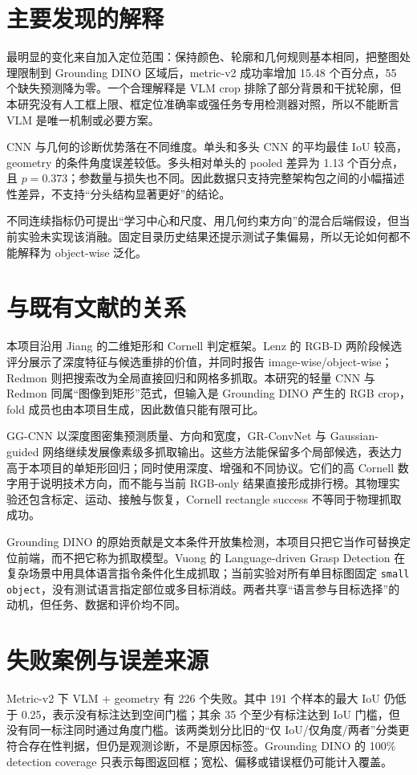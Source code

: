 \documentclass{l4proj}
\begin{document}
\section{主要发现的解释}
最明显的变化来自加入定位范围：保持颜色、轮廓和几何规则基本相同，把整图处理限制到 Grounding DINO 区域后，metric-v2 成功率增加 15.48 个百分点，55 个缺失预测降为零。一个合理解释是 VLM crop 排除了部分背景和干扰轮廓，但本研究没有人工框上限、框定位准确率或强任务专用检测器对照，所以不能断言 VLM 是唯一机制或必要方案。

CNN 与几何的诊断优势落在不同维度。单头和多头 CNN 的平均最佳 IoU 较高，geometry 的条件角度误差较低。多头相对单头的 pooled 差异为 1.13 个百分点，且 $p=0.373$；参数量与损失也不同。因此数据只支持完整架构包之间的小幅描述性差异，不支持“分头结构显著更好”的结论。

不同连续指标仍可提出“学习中心和尺度、用几何约束方向”的混合后端假设，但当前实验未实现该消融。固定目录历史结果还提示测试子集偏易，所以无论如何都不能解释为 object-wise 泛化。

\section{与既有文献的关系}
本项目沿用 Jiang 的二维矩形和 Cornell 判定框架\citep{jiang2011efficient}。Lenz 的 RGB-D 两阶段候选评分展示了深度特征与候选重排的价值，并同时报告 image-wise/object-wise\citep{lenz2015deep}；Redmon 则把搜索改为全局直接回归和网格多抓取\citep{redmon2015real}。本研究的轻量 CNN 与 Redmon 同属“图像到矩形”范式，但输入是 Grounding DINO 产生的 RGB crop，fold 成员也由本项目生成，因此数值只能有限可比。

GG-CNN 以深度图密集预测质量、方向和宽度\citep{morrison2018closing}，GR-ConvNet 与 Gaussian-guided 网络继续发展像素级多抓取输出\citep{kumra2020antipodal,li2022gaussian}。这些方法能保留多个局部候选，表达力高于本项目的单矩形回归；同时使用深度、增强和不同协议。它们的高 Cornell 数字用于说明技术方向，而不能与当前 RGB-only 结果直接形成排行榜。其物理实验还包含标定、运动、接触与恢复，Cornell rectangle success 不等同于物理抓取成功。

Grounding DINO 的原始贡献是文本条件开放集检测\citep{liu2023grounding}，本项目只把它当作可替换定位前端，而不把它称为抓取模型。Vuong 的 Language-driven Grasp Detection 在复杂场景中用具体语言指令条件化生成抓取\citep{vuong2024language}；当前实验对所有单目标图固定 \texttt{small object}，没有测试语言指定部位或多目标消歧。两者共享“语言参与目标选择”的动机，但任务、数据和评价均不同。

\section{失败案例与误差来源}
Metric-v2 下 VLM + geometry 有 226 个失败。其中 191 个样本的最大 IoU 仍低于 0.25，表示没有标注达到空间门槛；其余 35 个至少有标注达到 IoU 门槛，但没有同一标注同时通过角度门槛。该两类划分比旧的“仅 IoU/仅角度/两者”分类更符合存在性判据，但仍是观测诊断，不是原因标签。Grounding DINO 的 100\% detection coverage 只表示每图返回框；宽松、偏移或错误框仍可能计入覆盖。
\end{document}
